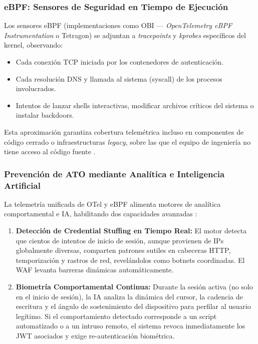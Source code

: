\documentclass[12pt, a4paper]{article}
\begin{document}
\subsubsection{eBPF: Sensores de Seguridad en Tiempo de Ejecución}

Los sensores eBPF (implementaciones como OBI --- \textit{OpenTelemetry eBPF
Instrumentation} \cite{obiRelease} o Tetragon) se adjuntan a
\textit{tracepoints} y \textit{kprobes} específicos del kernel, observando:

\begin{itemize}[noitemsep]
  \item Cada conexión TCP iniciada por los contenedores de autenticación.
  \item Cada resolución DNS y llamada al sistema (syscall) de los procesos
        involucrados.
  \item Intentos de lanzar shells interactivas, modificar archivos críticos del
        sistema o instalar backdoors.
\end{itemize}

Esta aproximación garantiza cobertura telemétrica incluso en componentes de
código cerrado o infraestructuras \textit{legacy}, sobre las que el equipo
de ingeniería no tiene acceso al código fuente \cite{groundcover2025,
linuxfoundation2025}.

\subsubsection{Prevención de ATO mediante Analítica e Inteligencia Artificial}

La telemetría unificada de OTel y eBPF alimenta motores de analítica
comportamental e IA, habilitando dos capacidades avanzadas \cite{clear2025,
digitalocean2025}:

\begin{enumerate}[noitemsep]
  \item \textbf{Detección de Credential Stuffing en Tiempo Real:} El motor
        detecta que cientos de intentos de inicio de sesión, aunque provienen
        de IPs globalmente diversas, comparten patrones sutiles en cabeceras
        HTTP, temporización y rastros de red, revelándolos como botnets
        coordinadas. El WAF levanta barreras dinámicas automáticamente.
  \item \textbf{Biometría Comportamental Continua:} Durante la sesión activa
        (no solo en el inicio de sesión), la IA analiza la dinámica del cursor,
        la cadencia de escritura y el ángulo de sostenimiento del dispositivo
        para perfilar al usuario legítimo. Si el comportamiento detectado
        corresponde a un script automatizado o a un intruso remoto, el sistema
        revoca inmediatamente los JWT asociados y exige re-autenticación
        biométrica.
\end{enumerate}
\end{document}
